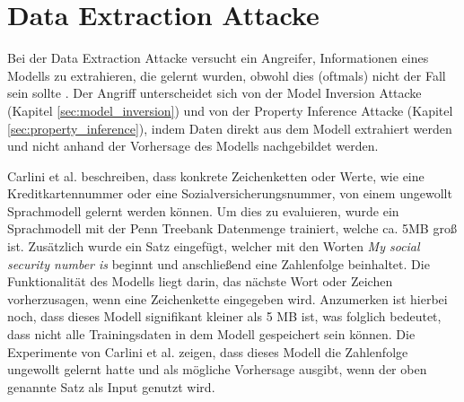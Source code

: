 \section{Data Extraction Attacke}\label{sec:data_ext}

Bei der Data Extraction Attacke versucht ein Angreifer, Informationen eines Modells zu extrahieren, die gelernt wurden, obwohl dies (oftmals) nicht der Fall sein sollte \cite{P-87}.
Der Angriff unterscheidet sich von der Model Inversion Attacke (Kapitel \ref{sec:model_inversion}) und von der Property Inference Attacke (Kapitel \ref{sec:property_inference}), indem Daten direkt aus dem Modell extrahiert werden und nicht anhand der Vorhersage des Modells nachgebildet werden.

Carlini et al. \cite{P-87} beschreiben, dass konkrete Zeichenketten oder Werte, wie eine Kreditkartennummer oder eine Sozialversicherungsnummer, von einem ungewollt Sprachmodell gelernt werden können.
Um dies zu evaluieren, wurde ein Sprachmodell mit der Penn Treebank Datenmenge trainiert, welche ca. 5MB groß ist. 
Zusätzlich wurde ein Satz eingefügt, welcher mit den Worten \textit{\dq My social security number is \dq} beginnt und anschließend eine Zahlenfolge beinhaltet.
Die Funktionalität des Modells liegt darin, das nächste Wort oder Zeichen vorherzusagen, wenn eine Zeichenkette eingegeben wird.
Anzumerken ist hierbei noch, dass dieses Modell signifikant kleiner als 5 MB ist, was folglich bedeutet, dass nicht alle Trainingsdaten in dem Modell gespeichert sein können.
Die Experimente von Carlini et al. \cite{P-87} zeigen, dass dieses Modell die Zahlenfolge ungewollt gelernt hatte und als mögliche Vorhersage ausgibt, wenn der oben genannte Satz als Input genutzt wird.

